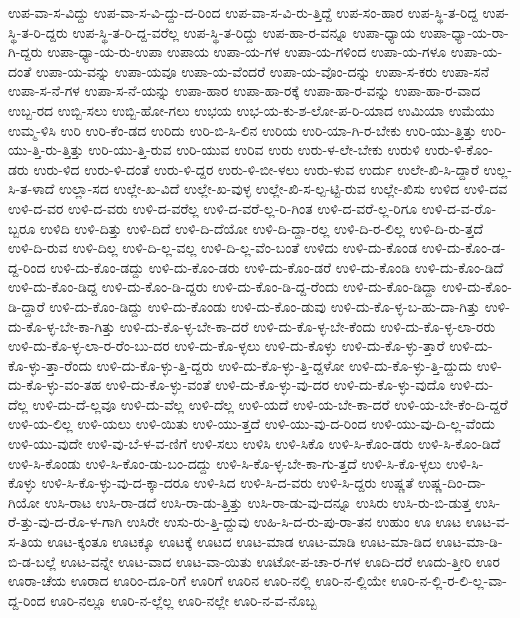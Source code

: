 {ಉಪ-ವಾ-ಸ-ವಿದ್ದು
ಉಪ-ವಾ-ಸ-ವಿ-ದ್ದು-ದ-ರಿಂದ
ಉಪ-ವಾ-ಸ-ವಿ-ರು-ತ್ತಿದ್ದೆ
ಉಪ-ಸಂ-ಹಾರ
ಉಪ-ಸ್ಥಿ-ತ-ರಿದ್ದ
ಉಪ-ಸ್ಥಿ-ತ-ರಿ-ದ್ದರು
ಉಪ-ಸ್ಥಿ-ತ-ರಿ-ದ್ದ-ವರೆಲ್ಲ
ಉಪ-ಸ್ಥಿ-ತ-ರಿದ್ದು
ಉಪ-ಹಾ-ರ-ವನ್ನೂ
ಉಪಾ-ಧ್ಯಾಯ
ಉಪಾ-ಧ್ಯಾ-ಯ-ರಾ-ಗಿ-ದ್ದರು
ಉಪಾ-ಧ್ಯಾ-ಯ-ರು-ಉಪಾ
ಉಪಾಯ
ಉಪಾ-ಯ-ಗಳ
ಉಪಾ-ಯ-ಗಳಿಂದ
ಉಪಾ-ಯ-ಗಳೂ
ಉಪಾ-ಯ-ದಂತೆ
ಉಪಾ-ಯ-ವನ್ನು
ಉಪಾ-ಯವೂ
ಉಪಾ-ಯ-ವೆಂದರೆ
ಉಪಾ-ಯ-ವೊಂ-ದನ್ನು
ಉಪಾ-ಸ-ಕರು
ಉಪಾ-ಸನೆ
ಉಪಾ-ಸ-ನೆ-ಗಳ
ಉಪಾ-ಸ-ನೆ-ಯನ್ನು
ಉಪಾ-ಹಾರ
ಉಪಾ-ಹಾ-ರಕ್ಕೆ
ಉಪಾ-ಹಾ-ರ-ವನ್ನು
ಉಪಾ-ಹಾ-ರ-ವಾದ
ಉಬ್ಬ-ರದ
ಉಬ್ಬಿ-ಸಲು
ಉಬ್ಬಿ-ಹೋ-ಗಲು
ಉಭಯ
ಉಭ-ಯ-ಕು-ಶ-ಲೋ-ಪ-ರಿ-ಯಾದ
ಉಮಿಯಾ
ಉಮೆಯು
ಉಮ್ಮ-ಳಿಸಿ
ಉರಿ
ಉರಿ-ಕೆಂ-ಡದ
ಉರಿದು
ಉರಿ-ಬಿ-ಸಿ-ಲಿನ
ಉರಿಯ
ಉರಿ-ಯಾ-ಗಿ-ರ-ಬೇಕು
ಉರಿ-ಯು-ತ್ತಿತ್ತು
ಉರಿ-ಯು-ತ್ತಿ-ರು-ತ್ತಿತ್ತು
ಉರಿ-ಯು-ತ್ತಿ-ರುವ
ಉರಿ-ಯುವ
ಉರಿವ
ಉರು
ಉರು-ಳ-ಲೇ-ಬೇಕು
ಉರುಳಿ
ಉರು-ಳಿ-ಕೊಂ-ಡರು
ಉರು-ಳಿದ
ಉರು-ಳಿ-ದಂತೆ
ಉರು-ಳಿ-ದ್ದರ
ಉರು-ಳಿ-ಬೀ-ಳಲು
ಉರು-ಳುವ
ಉರ್ದು
ಉಲೇ-ಖಿ-ಸಿ-ದ್ದಾರೆ
ಉಲ್ಲ-ಸಿ-ತ-ಳಾದೆ
ಉಲ್ಲಾ-ಸದ
ಉಲ್ಲೇ-ಖ-ವಿದೆ
ಉಲ್ಲೇ-ಖ-ವುಳ್ಳ
ಉಲ್ಲೇ-ಖಿ-ಸ-ಲ್ಪ-ಟ್ಟಿ-ರುವ
ಉಲ್ಲೇ-ಖಿಸು
ಉಳಿದ
ಉಳಿ-ದವ
ಉಳಿ-ದ-ವರ
ಉಳಿ-ದ-ವರು
ಉಳಿ-ದ-ವರೆಲ್ಲ
ಉಳಿ-ದ-ವರೆ-ಲ್ಲ-ರಿ-ಗಿಂತ
ಉಳಿ-ದ-ವರೆ-ಲ್ಲ-ರಿಗೂ
ಉಳಿ-ದ-ವ-ರೊ-ಬ್ಬರೂ
ಉಳಿದಿ
ಉಳಿ-ದಿತ್ತು
ಉಳಿ-ದಿದೆ
ಉಳಿ-ದಿ-ದೆಯೋ
ಉಳಿ-ದಿ-ದ್ದಾ-ರಲ್ಲ
ಉಳಿ-ದಿ-ರ-ಲಿಲ್ಲ
ಉಳಿ-ದಿ-ರು-ತ್ತದೆ
ಉಳಿ-ದಿ-ರುವ
ಉಳಿ-ದಿಲ್ಲ
ಉಳಿ-ದಿ-ಲ್ಲ-ವಲ್ಲ
ಉಳಿ-ದಿ-ಲ್ಲ-ವೆಂ-ಬಂತೆ
ಉಳಿದು
ಉಳಿ-ದು-ಕೊಂಡ
ಉಳಿ-ದು-ಕೊಂ-ಡ-ದ್ದ-ರಿಂದ
ಉಳಿ-ದು-ಕೊಂ-ಡದ್ದು
ಉಳಿ-ದು-ಕೊಂ-ಡರು
ಉಳಿ-ದು-ಕೊಂ-ಡರೆ
ಉಳಿ-ದು-ಕೊಂಡಿ
ಉಳಿ-ದು-ಕೊಂ-ಡಿದೆ
ಉಳಿ-ದು-ಕೊಂ-ಡಿದ್ದ
ಉಳಿ-ದು-ಕೊಂ-ಡಿ-ದ್ದರು
ಉಳಿ-ದು-ಕೊಂ-ಡಿ-ದ್ದ-ರೆಂದು
ಉಳಿ-ದು-ಕೊಂ-ಡಿದ್ದಾ
ಉಳಿ-ದು-ಕೊಂ-ಡಿ-ದ್ದಾರೆ
ಉಳಿ-ದು-ಕೊಂ-ಡಿದ್ದು
ಉಳಿ-ದು-ಕೊಂಡು
ಉಳಿ-ದು-ಕೊಂ-ಡುವು
ಉಳಿ-ದು-ಕೊ-ಳ್ಳ-ಬ-ಹು-ದಾ-ಗಿತ್ತು
ಉಳಿ-ದು-ಕೊ-ಳ್ಳ-ಬೇ-ಕಾ-ಗಿತ್ತು
ಉಳಿ-ದು-ಕೊ-ಳ್ಳ-ಬೇ-ಕಾ-ದರೆ
ಉಳಿ-ದು-ಕೊ-ಳ್ಳ-ಬೇ-ಕೆಂದು
ಉಳಿ-ದು-ಕೊ-ಳ್ಳ-ಲಾ-ರರು
ಉಳಿ-ದು-ಕೊ-ಳ್ಳ-ಲಾ-ರ-ರೆಂ-ಬು-ದರ
ಉಳಿ-ದು-ಕೊ-ಳ್ಳಲು
ಉಳಿ-ದು-ಕೊಳ್ಳು
ಉಳಿ-ದು-ಕೊ-ಳ್ಳು-ತ್ತಾರೆ
ಉಳಿ-ದು-ಕೊ-ಳ್ಳು-ತ್ತಾ-ರೆಂದು
ಉಳಿ-ದು-ಕೊ-ಳ್ಳು-ತ್ತಿ-ದ್ದರು
ಉಳಿ-ದು-ಕೊ-ಳ್ಳು-ತ್ತಿ-ದ್ದಳೋ
ಉಳಿ-ದು-ಕೊ-ಳ್ಳು-ತ್ತಿ-ದ್ದುದು
ಉಳಿ-ದು-ಕೊ-ಳ್ಳು-ವಂ-ತಹ
ಉಳಿ-ದು-ಕೊ-ಳ್ಳು-ವಂತೆ
ಉಳಿ-ದು-ಕೊ-ಳ್ಳು-ವು-ದರ
ಉಳಿ-ದು-ಕೊ-ಳ್ಳು-ವುದೊ
ಉಳಿ-ದು-ದೆಲ್ಲ
ಉಳಿ-ದು-ದೆ-ಲ್ಲವೂ
ಉಳಿ-ದು-ವೆಲ್ಲ
ಉಳಿ-ದೆಲ್ಲ
ಉಳಿ-ಯದೆ
ಉಳಿ-ಯ-ಬೇ-ಕಾ-ದರೆ
ಉಳಿ-ಯ-ಬೇ-ಕೆಂ-ದಿ-ದ್ದರೆ
ಉಳಿ-ಯ-ಲಿಲ್ಲ
ಉಳಿ-ಯಲು
ಉಳಿ-ಯಿತು
ಉಳಿ-ಯು-ತ್ತದೆ
ಉಳಿ-ಯು-ವು-ದ-ರಿಂದ
ಉಳಿ-ಯು-ವು-ದಿ-ಲ್ಲ-ವೆಂದು
ಉಳಿ-ಯು-ವುದೇ
ಉಳಿ-ವು-ಬೆ-ಳ-ವ-ಣಿಗೆ
ಉಳಿ-ಸಲು
ಉಳಿಸಿ
ಉಳಿ-ಸಿಕೊ
ಉಳಿ-ಸಿ-ಕೊಂ-ಡರು
ಉಳಿ-ಸಿ-ಕೊಂ-ಡಿದೆ
ಉಳಿ-ಸಿ-ಕೊಂಡು
ಉಳಿ-ಸಿ-ಕೊಂ-ಡು-ಬಂ-ದದ್ದು
ಉಳಿ-ಸಿ-ಕೊ-ಳ್ಳ-ಬೇ-ಕಾ-ಗು-ತ್ತದೆ
ಉಳಿ-ಸಿ-ಕೊ-ಳ್ಳಲು
ಉಳಿ-ಸಿ-ಕೊಳ್ಳು
ಉಳಿ-ಸಿ-ಕೊ-ಳ್ಳು-ವು-ದ-ಕ್ಕಾ-ದರೂ
ಉಳಿ-ಸಿದ
ಉಳಿ-ಸಿ-ದ-ವರು
ಉಳಿ-ಸಿ-ದ್ದರು
ಉಷ್ಣತೆ
ಉಷ್ಣ-ದಿಂ-ದಾ-ಗಿಯೋ
ಉಸಿ-ರಾಟ
ಉಸಿ-ರಾ-ಡದೆ
ಉಸಿ-ರಾ-ಡು-ತ್ತಿತ್ತು
ಉಸಿ-ರಾ-ಡು-ವು-ದನ್ನೂ
ಉಸಿರು
ಉಸಿ-ರು-ಬಿ-ಡುತ್ತ
ಉಸಿ-ರೆ-ತ್ತು-ವು-ದ-ರೊ-ಳ-ಗಾಗಿ
ಉಸಿರೇ
ಉಸು-ರು-ತ್ತಿ-ದ್ದುವು
ಉಹಿ-ಸಿ-ದ-ರು-ಪು-ರಾ-ತನ
ಉಹುಂ
ಊ
ಊಟ
ಊಟ-ವ-ಸ-ತಿಯ
ಊಟ-ಕ್ಕಂತೂ
ಊಟಕ್ಕೂ
ಊಟಕ್ಕೆ
ಊಟದ
ಊಟ-ಮಾಡ
ಊಟ-ಮಾಡಿ
ಊಟ-ಮಾ-ಡಿದ
ಊಟ-ಮಾ-ಡಿ-ಬಿ-ಡ-ಬಲ್ಲೆ
ಊಟ-ವನ್ನೇ
ಊಟ-ವಾದ
ಊಟ-ವಾ-ಯಿತು
ಊಟೋ-ಪ-ಚಾ-ರ-ಗಳ
ಊದಿ-ದರೆ
ಊದು-ತ್ತೀರಿ
ಊರ
ಊರಾ-ಚೆಯ
ಊರಾದ
ಊರಿಂ-ದೂ-ರಿಗೆ
ಊರಿಗೆ
ಊರಿನ
ಊರಿ-ನಲ್ಲಿ
ಊರಿ-ನ-ಲ್ಲಿಯೇ
ಊರಿ-ನ-ಲ್ಲಿ-ರ-ಲಿ-ಲ್ಲ-ವಾ-ದ್ದ-ರಿಂದ
ಊರಿ-ನಲ್ಲೂ
ಊರಿ-ನ-ಲ್ಲೆಲ್ಲ
ಊರಿ-ನಲ್ಲೇ
ಊರಿ-ನ-ವ-ನೊಬ್ಬ
}
